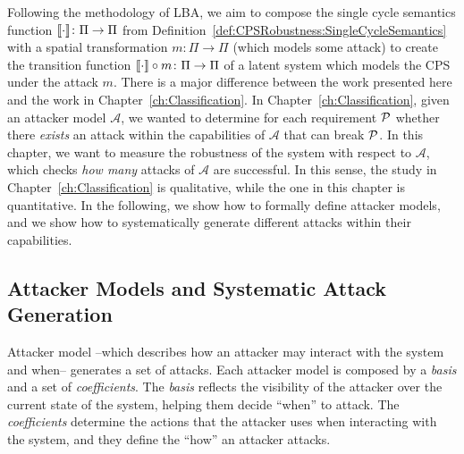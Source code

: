 Following the methodology of LBA, we aim to compose the single cycle semantics function ${{{\llbracket\cdot\rrbracket}}}\colon\Pi\rightarrow\Pi$ from Definition~\ref{def:CPSRobustness:SingleCycleSemantics} with a spatial transformation $m\colon \Pi\rightarrow\Pi$ (which models some attack) to create the transition function ${{{\llbracket\cdot\rrbracket}}}\circ m\colon\Pi\rightarrow\Pi$ of a latent system which models the CPS under the attack $m$. 
{There is a major difference between the work presented here and the work in Chapter~\ref{ch:Classification}. In Chapter~\ref{ch:Classification}, given an attacker model $\mathcal{A}$, we wanted to determine for each requirement $\mathcal{P}$ whether there \emph{exists} an attack within the capabilities of $\mathcal{A}$ that can break $\mathcal{P}$. In this chapter, we want to measure the robustness of the system with respect to $\mathcal{A}$, which checks \emph{how many} attacks of $\mathcal{A}$ are successful. In this sense, the study in Chapter~\ref{ch:Classification} is qualitative, while the one in this chapter is quantitative. In the following, we show how to formally define attacker models, and we show how to systematically generate different attacks within their capabilities. 
}
\subsection{Attacker Models and Systematic Attack Generation} 
Attacker model --which describes how an attacker may interact with the system and when-- generates a set of attacks. Each attacker model is composed by a \emph{basis} and a set of \emph{coefficients}. The \emph{basis} reflects the visibility of the attacker over the current state of the system, helping them decide ``when'' to attack. The \emph{coefficients} determine the actions that the attacker uses when interacting with the system, and they define the ``how'' an attacker attacks.

